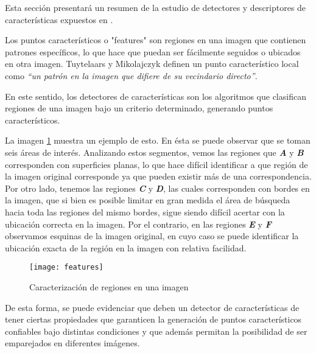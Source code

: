 Esta sección presentará un resumen de la estudio de detectores y descriptores de características expuestos en \cite{victor}.

Los puntos característicos o "features" son regiones en una imagen que contienen patrones específicos, lo que hace que puedan ser fácilmente seguidos o ubicados en otra imagen. Tuytelaars y Mikolajczyk \cite{Tuytelaars} definen un punto característico local como \textit{``un patrón en la imagen que difiere de su vecindario directo''}. 

En este sentido, los detectores de características son los algoritmos que clasifican regiones de una imagen bajo un criterio determinado, generando puntos característicos.

La imagen \ref{imagen:features} muestra un ejemplo de esto. En ésta se puede observar que se toman seis áreas de interés. Analizando estos segmentos, vemos las regiones que \textbf{\textit{A}} y \textbf{\textit{B}} corresponden con superficies planas, lo que hace difícil  identificar a que región de la imagen original corresponde ya que pueden existir más de una correspondencia. Por otro lado, tenemos las regiones \textbf{\textit{C}} y \textbf{\textit{D}}, las cuales corresponden con bordes en la imagen, que si bien es posible limitar en gran medida el área de búsqueda hacia toda las regiones del mismo bordes, sigue siendo difícil acertar con la ubicación correcta en la imagen. Por el contrario, en las regiones \textbf{\textit{E}} y \textbf{\textit{F}} observamos esquinas de la imagen original, en cuyo caso se puede identificar  la ubicación exacta de la región en la imagen con relativa facilidad.

\begin{figure}[H]
	\centering
	\texttt{[image: features]}
	\caption[Caracterización de regiones en una imagen]{Caracterización de regiones en una imagen\protect\footnotemark}
	\label{imagen:features}
\end{figure}

De esta forma, se puede evidenciar que deben un detector de características de tener ciertas propiedades que garanticen la generación de puntos característicos confiables bajo distintas condiciones y que además permitan la posibilidad de ser emparejados en diferentes imágenes.



